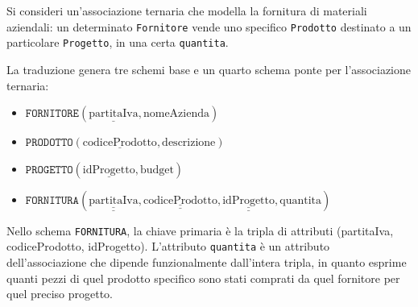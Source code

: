 \begin{example}
Si consideri un'associazione ternaria che modella la fornitura di materiali aziendali: un determinato \texttt{Fornitore} vende uno specifico \texttt{Prodotto} destinato a un particolare \texttt{Progetto}, in una certa \texttt{quantita}.

La traduzione genera tre schemi base e un quarto schema ponte per l'associazione ternaria:
\begin{itemize}
    \item $\texttt{FORNITORE}(\underline{\text{partitaIva}}, \text{nomeAzienda})$
    \item $\texttt{PRODOTTO}(\underline{\text{codiceProdotto}}, \text{descrizione})$
    \item $\texttt{PROGETTO}(\underline{\text{idProgetto}}, \text{budget})$
    \item $\texttt{FORNITURA}(\underline{\underline{\text{partitaIva}}}, \underline{\underline{\text{codiceProdotto}}}, \underline{\underline{\text{idProgetto}}}, \text{quantita})$
\end{itemize}

Nello schema \texttt{FORNITURA}, la chiave primaria è la tripla di attributi (partitaIva, codiceProdotto, idProgetto). L'attributo \texttt{quantita} è un attributo dell'associazione che dipende funzionalmente dall'intera tripla, in quanto esprime quanti pezzi di quel prodotto specifico sono stati comprati da quel fornitore per quel preciso progetto.
\end{example}

